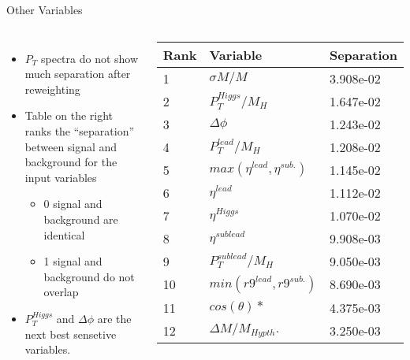 \documentclass[t]{beamer}
\begin{document}
\begin{frame}{Other Variables}
  \begin{columns}[c]
  \begin{itemize}
    \item $P_{T}$ spectra do not show much separation after reweighting
    \item Table on the right ranks the ``separation'' between signal and
    background for the input variables
    \begin{itemize}
      \item 0 signal and background are identical
      \item 1 signal and background do not overlap
    \end{itemize}
    \item $P_{T}^{Higgs}$ and $\Delta \phi$ are the next best sensetive
    variables.
  \end{itemize}
  \tiny{
  \begin{center}
    \begin{tabular}{ l | l | l } \hline
        Rank & Variable                     & Separation\\
        \hline
        1 & $\sigma M / M                 $ & 3.908e-02\\
        2 & $P_{T}^{Higgs}/M_{H}         $ & 1.647e-02\\
        3 & $\Delta \phi                 $ & 1.243e-02\\
        4 & $P_{T}^{lead} / M_{H}        $ & 1.208e-02\\
        5 & $max(\eta^{lead},\eta^{sub.})$ & 1.145e-02\\
        6 & $\eta^{lead}                 $ & 1.112e-02\\
        7 & $\eta^{Higgs}                $ & 1.070e-02\\
        8 & $\eta^{sublead}              $ & 9.908e-03\\
        9 & $P_{T}^{sublead} / M_{H}     $ & 9.050e-03\\
       10 & $min(r9^{lead},r9^{sub.})    $ & 8.690e-03\\
       11 & $cos(\theta)*                $ & 4.375e-03\\
       12 & $\Delta M / M_{Hypth}.        $ & 3.250e-03\\
       \hline
    \end{tabular}
  \end{center}
  }
  \end{columns}
\end{frame}
\end{document}
